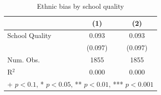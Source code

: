 \begin{table}[htbp]\centering
\caption{Ethnic bias by school quality}
\begin{tabular}{lcc}
\hline
 & \textbf{(1)} & \textbf{(2)} \\
\hline
School Quality & 0.093 & 0.093 \\
            & (0.097) & (0.097) \\
\hline
Num. Obs.   & 1855 & 1855 \\
R$^2$       & 0.000 & 0.000 \\
\hline
\multicolumn{3}{l}{\footnotesize + $p<0.1$, * $p<0.05$, ** $p<0.01$, *** $p<0.001$} \\
\end{tabular}
\label{tab:ethnic_sq}
\end{table}
